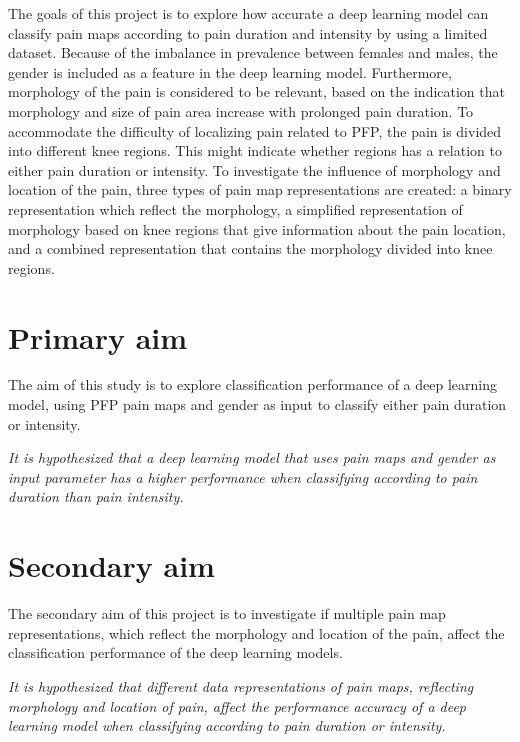\noindent
The goals of this project is to explore how accurate a deep learning model can classify pain maps according to pain duration and intensity by using a limited dataset. Because of the imbalance in prevalence between females and males, the gender is included as a feature in the deep learning model. 
Furthermore, morphology of the pain is considered to be relevant, based on the indication that morphology and size of pain area increase with prolonged pain duration. 
To accommodate the difficulty of localizing pain related to PFP, the pain is divided into different knee regions. This might indicate whether regions has a relation to either pain duration or intensity.
\noindent
To investigate the influence of morphology and location of the pain, three types of pain map representations are created: a binary representation which reflect the morphology, a simplified representation of morphology based on knee regions that give information about the pain location, and a combined representation that contains the morphology divided into knee regions.   

\section{Primary aim}
The aim of this study is to explore classification performance of a deep learning model, using PFP pain maps and gender as input to classify either pain duration or intensity. 
\vspace{4mm}
\noindent
\begin{center}
\textit{It is hypothesized that a deep learning model that uses pain maps and gender as input parameter has a higher performance when classifying according to pain duration than pain intensity.}
\end{center}

\section{Secondary aim}
The secondary aim of this project is to investigate if multiple pain map representations, which reflect the morphology and location of the pain, affect the  classification performance of the deep learning models.

\vspace{4mm}
\noindent
\begin{center}
\textit{It is hypothesized that different data representations of pain maps, reflecting morphology and location of pain, affect the performance
accuracy of a deep learning model when classifying according to pain duration or intensity.
}
\end{center}

